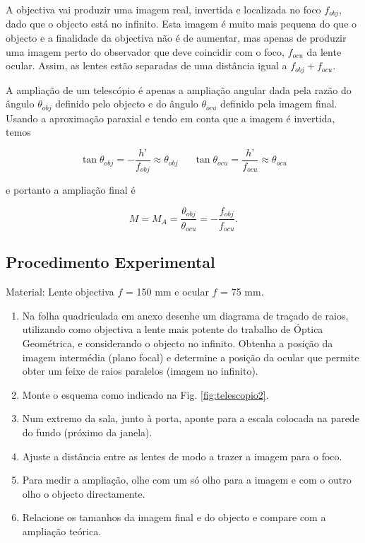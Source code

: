 \documentclass[a4paper,12pt]{article}      %
\begin{document}
A objectiva vai produzir uma imagem real, invertida e localizada no foco $f_{obj}$, dado que o objecto está no infinito. Esta imagem é muito mais pequena do que o objecto e a finalidade da objectiva não é de aumentar, mas apenas de produzir uma imagem perto do observador que deve coincidir com o foco, $f_{ocu}$ da lente ocular. Assim, as lentes estão separadas de uma distância igual a $f_{obj} + f_{ocu}$.

A ampliação de um telescópio é apenas a ampliação angular dada pela razão do ângulo $\theta_{obj}$ definido pelo objecto e do ângulo $\theta_{ocu}$ definido pela imagem final. Usando a aproximação paraxial e tendo em conta que a imagem é invertida, temos

\begin{equation}
\tan\theta_{obj}= -\frac{h’}{f_{obj}} \approx \theta_{obj} \,\,\,\,\,\,\,\,\,\tan\theta_{ocu} =\frac{h’}{f_{ocu}}\approx\theta_{ocu}
\end{equation}

e portanto a ampliação final é

\begin{equation}
M=M_A =\frac{\theta_{obj}}{\theta_{ocu}}= -\frac{f_{obj}}{f_{ocu}}.
\end{equation}

\subsection{\sf Procedimento Experimental}

Material: Lente objectiva $f$ = 150 mm e ocular $f$ = 75 mm.

\begin{enumerate}
\item Na folha quadriculada em anexo desenhe um diagrama de traçado de raios, utilizando como objectiva a lente mais potente do trabalho de Óptica Geométrica, e considerando o objecto no infinito. Obtenha a posição da imagem intermédia (plano focal) e determine a posição da ocular que permite obter um feixe de raios paralelos (imagem no infinito).
\item Monte o esquema como indicado na Fig. \ref{fig:telescopio2}.
\item Num extremo da sala, junto à porta, aponte para a escala colocada na parede do fundo (próximo da janela).
\item Ajuste a distância entre as lentes de modo a trazer a imagem para o foco.
\item Para medir a ampliação, olhe com um só olho para a imagem e com o outro olho o objecto directamente.
\item Relacione os tamanhos da imagem final e do objecto e compare com a ampliação teórica.
\end{enumerate}
\end{document}
